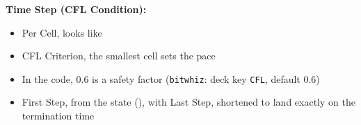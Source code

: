 \documentclass[11pt,addpoints]{exam}
\begin{document}
\clearpage


\begin{tcolorbox}[breakable]
\textbf{Time Step (CFL Condition):}\vspace{.5em}
\begin{itemize}
\item Per Cell, \hspace{3mm}  \hspace{7mm} looks like \vspace{.5em}
\item CFL Criterion, \hspace{3mm}  \hspace{7mm} the smallest cell sets the pace\vspace{.5em}
\item In the code, \hspace{3mm}  \hspace{7mm} 0.6 is a safety factor (\texttt{bitwhiz}: deck key \texttt{CFL}, default 0.6)\vspace{.5em}
\item First Step, \hspace{3mm}  \hspace{2mm} from the  state (), with  \hspace{7mm} Last Step, \hspace{3mm} shortened to land exactly on the termination time
\end{itemize}
\end{tcolorbox}


\;\\
\end{document}
